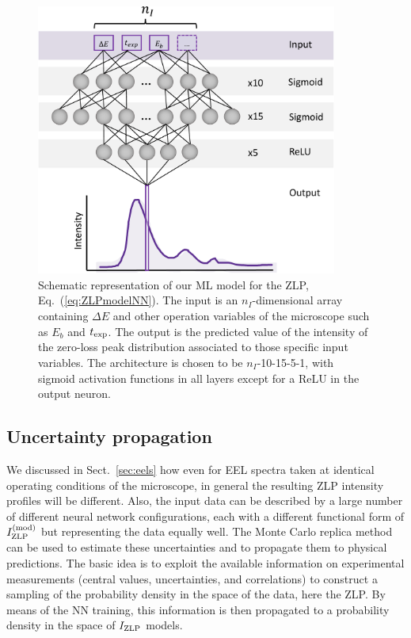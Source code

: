 \begin{figure}[t]
    \centering
    \includegraphics[width=99mm]{plots/architecture.pdf}
    \caption{Schematic representation of our ML model for the ZLP, Eq.~(\ref{eq:ZLPmodelNN}).
      The input is an $n_I$-dimensional array containing $\Delta E$ and other
      operation variables of the microscope such as $E_b$ and $t_{\rm exp}$.
      The output is the predicted value of the intensity of the zero-loss peak
      distribution associated to those specific input variables.
      The architecture is chosen to be $n_I$-10-15-5-1, with sigmoid activation functions
      in all layers except for a ReLU in the output neuron.
    }
    \label{fig:architecture}
\end{figure}


\subsection{Uncertainty propagation}

We discussed in Sect.~\ref{sec:eels} how
even for EEL spectra taken at identical operating conditions of the microscope,
in general the resulting ZLP intensity profiles will be different.
%
Also, the input data can be described by a large number of different neural 
network configurations, each with a different functional form of $I_{\rm ZLP}^{(\rm mod)}$
but representing the data equally well.
%
The Monte Carlo replica method can be used to estimate these uncertainties
and to propagate them to physical predictions.
%
The basic idea  is to exploit the available information
on experimental measurements (central values, uncertainties, and correlations)
to construct a sampling of the probability density in the space of 
the data, here the ZLP.
%
By means of the NN training, this information is then propagated
to a probability density in the space of $I_{\rm ZLP}$ models.

